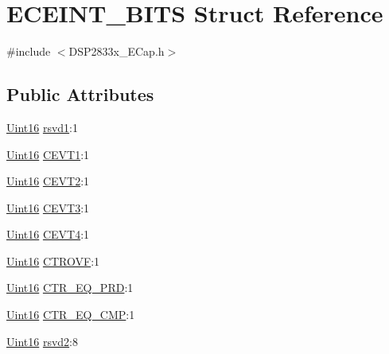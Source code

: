\hypertarget{struct_e_c_e_i_n_t___b_i_t_s}{}\section{E\+C\+E\+I\+N\+T\+\_\+\+B\+I\+T\+S Struct Reference}
\label{struct_e_c_e_i_n_t___b_i_t_s}


{\ttfamily \#include $<$D\+S\+P2833x\+\_\+\+E\+Cap.\+h$>$}

\subsection*{Public Attributes}
\begin{DoxyCompactItemize}
\item 
\hyperlink{_d_s_p2833x___device_8h_a59a9f6be4562c327cbfb4f7e8e18f08b}{Uint16} \hyperlink{struct_e_c_e_i_n_t___b_i_t_s_a790cd8d5945052c1f742b321290eb632}{rsvd1}\+:1
\item 
\hyperlink{_d_s_p2833x___device_8h_a59a9f6be4562c327cbfb4f7e8e18f08b}{Uint16} \hyperlink{struct_e_c_e_i_n_t___b_i_t_s_ad2efafbc0ad99d74d64a8fb7d084363e}{C\+E\+V\+T1}\+:1
\item 
\hyperlink{_d_s_p2833x___device_8h_a59a9f6be4562c327cbfb4f7e8e18f08b}{Uint16} \hyperlink{struct_e_c_e_i_n_t___b_i_t_s_a2fbef3b6d5a81c0158e1572880ef5242}{C\+E\+V\+T2}\+:1
\item 
\hyperlink{_d_s_p2833x___device_8h_a59a9f6be4562c327cbfb4f7e8e18f08b}{Uint16} \hyperlink{struct_e_c_e_i_n_t___b_i_t_s_a9af94a18cf2d6ba5aefc191d568de6cb}{C\+E\+V\+T3}\+:1
\item 
\hyperlink{_d_s_p2833x___device_8h_a59a9f6be4562c327cbfb4f7e8e18f08b}{Uint16} \hyperlink{struct_e_c_e_i_n_t___b_i_t_s_aeb37cf07a287eb8f15d3bebd5f332eb8}{C\+E\+V\+T4}\+:1
\item 
\hyperlink{_d_s_p2833x___device_8h_a59a9f6be4562c327cbfb4f7e8e18f08b}{Uint16} \hyperlink{struct_e_c_e_i_n_t___b_i_t_s_a17cf1a9a494ae3dca3b46dab502bec97}{C\+T\+R\+O\+V\+F}\+:1
\item 
\hyperlink{_d_s_p2833x___device_8h_a59a9f6be4562c327cbfb4f7e8e18f08b}{Uint16} \hyperlink{struct_e_c_e_i_n_t___b_i_t_s_ab6d627ea5c198a0f3791918b6d1d928a}{C\+T\+R\+\_\+\+E\+Q\+\_\+\+P\+R\+D}\+:1
\item 
\hyperlink{_d_s_p2833x___device_8h_a59a9f6be4562c327cbfb4f7e8e18f08b}{Uint16} \hyperlink{struct_e_c_e_i_n_t___b_i_t_s_a3e35ee86f8942c3d9c178b981c5e78c2}{C\+T\+R\+\_\+\+E\+Q\+\_\+\+C\+M\+P}\+:1
\item 
\hyperlink{_d_s_p2833x___device_8h_a59a9f6be4562c327cbfb4f7e8e18f08b}{Uint16} \hyperlink{struct_e_c_e_i_n_t___b_i_t_s_a05a2a5468e9c0421d82b10b9c6bafd30}{rsvd2}\+:8
\end{DoxyCompactItemize}



